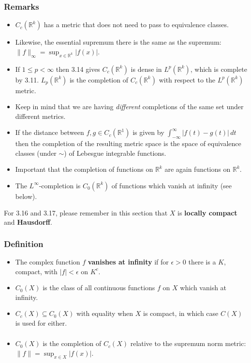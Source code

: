 \documentclass{article}
\newcounter{topicnumber}[section]
\newcommand{\steptopic}[1][1]{\addtocounter{topicnumber}{#1}}
\newenvironment{topic}[1]{%
\steptopic%
\subsubsection{#1}%
\begin{itemize}%
}{%
\end{itemize}%
}
\newcommand{\term}[1]{{\bf #1}}
\newcommand{\remark}{\item}
\newcommand{\note}{\item[{\em Note:}]}
\begin{document}
\begin{topic}{Remarks}
\remark $C_c(\mathbb{R}^k)$ has a metric that does not need to pass to equivalence classes.
\remark Likewise, the essential supremum there is the same as the supremum: $\|f\|_\infty = \sup_{x \in \mathbb{R}^k} |f(x)|$.
\remark If $1 \leq p < \infty$ then 3.14 gives $C_c(\mathbb{R}^k)$ is dense in $L^p(\mathbb{R}^k)$, which is complete by 3.11. $L_p(\mathbb{R}^k)$ is the completion of $C_c(\mathbb{R}^k)$ with respect to the $L^p(\mathbb{R}^k)$ metric.
\note Keep in mind that we are having {\em different} completions of the same set under different metrics.
\remark If the distance between $f, g \in C_c(\mathbb{R}^1)$ is given by $\int_{-\infty}^\infty |f(t) - g(t)|\,dt$ then the completion of the resulting metric space is the space of equivalence classes (under $\sim$) of Lebesgue integrable functions.
\note Important that the completion of functions on $\mathbb{R}^k$ are again functions on $\mathbb{R}^k$.
\remark The $L^\infty$-completion is $C_0(\mathbb{R}^k)$ of functions which vanish at infinity (see below).
\end{topic}

 For 3.16 and 3.17, please remember in this section that $X$ is {\bf locally compact} and {\bf Hausdorff}.

\begin{topic}{Definition}
\remark The complex function $f$ \term{vanishes at infinity} if for $\epsilon > 0$ there is a $K$, compact, with $|f| < \epsilon$ on $K^c$.
\remark $C_0(X)$ is the class of all continuous functions $f$ on $X$ which vanish at infinity.
\remark $C_c(X) \subseteq C_0(X)$ with equality when $X$ is compact, in which case $C(X)$ is used for either.
\end{topic}

\begin{topic}{}
\remark $C_0(X)$ is the completion of $C_c(X)$ relative to the supremum norm metric: $\|f\| = \sup_{x \in X} |f(x)|$.
\end{topic}
\end{document}
